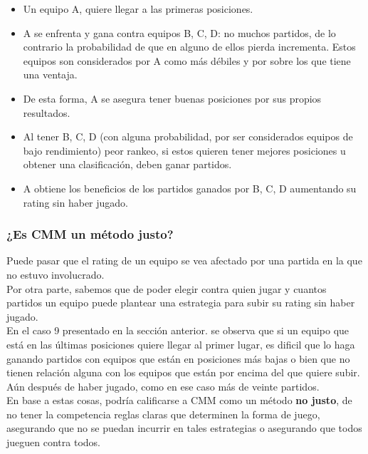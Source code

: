\begin{itemize}
    \item Un equipo A, quiere llegar a las primeras posiciones.
    \item A se enfrenta y gana contra equipos B, C, D: no muchos partidos, de lo contrario la probabilidad de que en alguno de ellos pierda incrementa. Estos equipos son considerados por A como más débiles y por sobre los que tiene una ventaja.
    \item De esta forma, A se asegura tener buenas posiciones por sus propios resultados.
    \item Al tener B, C, D (con alguna probabilidad, por ser considerados equipos de bajo rendimiento) peor rankeo, si estos quieren tener mejores posiciones u obtener una clasificación, deben ganar partidos.
    \item A obtiene los beneficios de los partidos ganados por B, C, D aumentando su rating sin haber jugado.
\end{itemize}

\subsubsection{¿Es CMM un método justo?}

Puede pasar que el rating de un equipo se vea afectado por una partida en la que no estuvo involucrado.\\

Por otra parte, sabemos que de poder elegir contra quien jugar y cuantos partidos un equipo puede plantear una estrategia para subir su rating sin haber jugado.\\

En el caso 9 presentado en la sección anterior. se observa que si un equipo que está en las últimas posiciones quiere llegar al primer lugar, es dificil que lo haga ganando partidos con equipos que están en posiciones más bajas o bien que no tienen relación alguna con los equipos que están por encima del que quiere subir. Aún después de haber jugado, como en ese caso más de veinte partidos.\\

En base a estas cosas, podría calificarse a CMM como un método \textbf{no justo}, de no tener la competencia reglas claras que determinen la forma de juego, asegurando que no se puedan incurrir en tales estrategias o asegurando que todos jueguen contra todos.